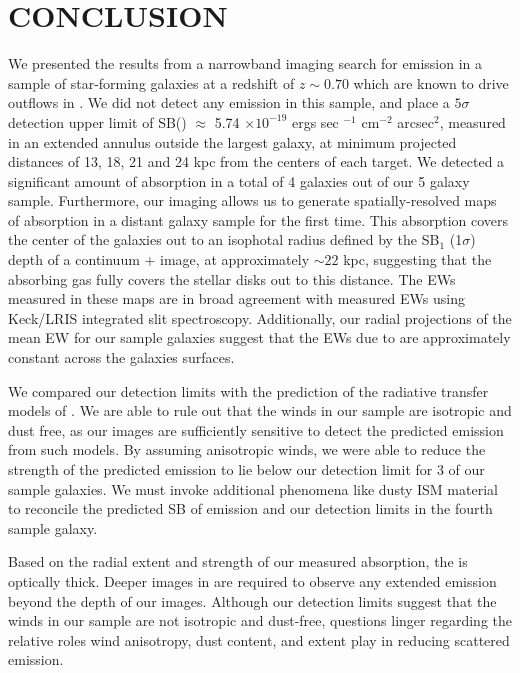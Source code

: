 \documentclass[twocolumn]{aastex61}
\begin{document}
\section{CONCLUSION}\label{sec:conclusion}
We presented the results from a narrowband imaging search for  emission in a sample of star-forming galaxies at a redshift of $z \sim 0.70$ which are known to drive outflows in  . We did not detect any  emission in this sample, and place a $5\sigma$ detection upper limit of SB() $\approx$ 5.74 $\times 10^{-19}$ ergs sec $^{-1}$ cm$^{-2}$ arcsec$^2$, measured in an extended annulus outside the largest galaxy, at minimum projected distances of 13, 18, 21 and 24 kpc from the centers of each target. We detected a significant amount of  absorption in a total of 4 galaxies out of our 5 galaxy sample. Furthermore, our imaging allows us to generate spatially-resolved maps of  absorption in a distant galaxy sample for the first time. This absorption covers the center of the galaxies out to an isophotal radius defined by the SB$_1$ (1$\sigma$) depth of a continuum +  image, at approximately $\sim 22$ kpc, suggesting that the absorbing gas fully covers the stellar disks out to this distance. The EWs measured in these maps are in broad agreement with measured EWs using Keck/LRIS integrated slit spectroscopy. Additionally, our radial projections of the mean EW for our sample galaxies suggest that the EWs due to  are approximately constant across the galaxies surfaces. 

We compared our detection limits with the prediction of the radiative transfer models of \cite{Prochaska_2011}. We are able to rule out that the winds in our sample are isotropic and dust free, as our images are sufficiently sensitive to detect the predicted emission from such models. By assuming anisotropic winds, we were able to reduce the strength of the predicted emission to lie below our detection limit for 3 of our sample galaxies. We must invoke additional phenomena like dusty ISM material 
to reconcile the predicted SB of emission and our detection limits in the fourth sample galaxy. 


Based on the radial extent and strength of our measured  absorption, the  is optically thick. Deeper images in  are required to observe any extended emission beyond the depth of our images.  Although our detection limits suggest that the winds in our sample are not isotropic and dust-free, questions linger regarding the relative roles wind anisotropy, dust content, and extent play in reducing scattered emission.
\end{document}

